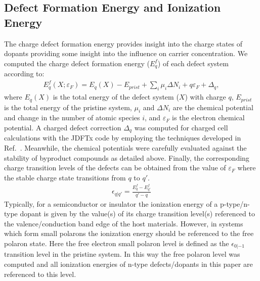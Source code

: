 \subsection{Defect Formation Energy and Ionization Energy}
The charge defect formation energy provides insight into the charge states of dopants providing some insight into the influence on carrier concentration.
We computed the charge defect formation energy ($E^f_q$) of each defect system according to:
\begin{align}
    E^f_q(X; \varepsilon_F) = E_q(X) - E_{prist} + \sum_i \mu_i \Delta N_i + q \varepsilon_F + \Delta_q,
    \label{eq:cfe}
\end{align}
where $E_q(X)$ is the total energy of the defect system ($X$) with charge $q$, $E_{prist}$ is the total energy of the pristine system, $\mu_i$ and $\Delta N_i$ are the chemical potential and change in the number of atomic species $i$, and $\varepsilon_F$ is the electron chemical potential. A charged defect correction $\Delta_q$ was computed for charged cell calculations with the JDFTx code \cite{JDFTx} by employing the techniques developed in Ref.~\cite{wu2017first,ping2013}. Meanwhile, the chemical potentials were carefully evaluated against the stability of byproduct compounds as detailed above.
Finally, the corresponding charge transition levels of the defects can be obtained from the value of $\varepsilon_F$ where the stable charge state transitions from $q$ to $q'$.
\begin{align}
    \epsilon_{q|q'} = \frac{E^f_q - E^f_{q'}}{q' - q}
    \label{eq:ctl}
\end{align}
Typically, for a semiconductor or insulator the ionization energy of a p-type/n-type dopant is given by the value(s) of its charge transition level(s) referenced to the valence/conduction band edge of the host materials. However, in systems which form small polarons the ionization energy should be referenced to the free polaron state. \cite{seo2018role} Here the free electron small polaron level is defined as the $\epsilon_{0|-1}$ transition level in the pristine system. In this way the free polaron level was computed and all ionization energies of n-type defects/dopants in this paper are referenced to this level.



